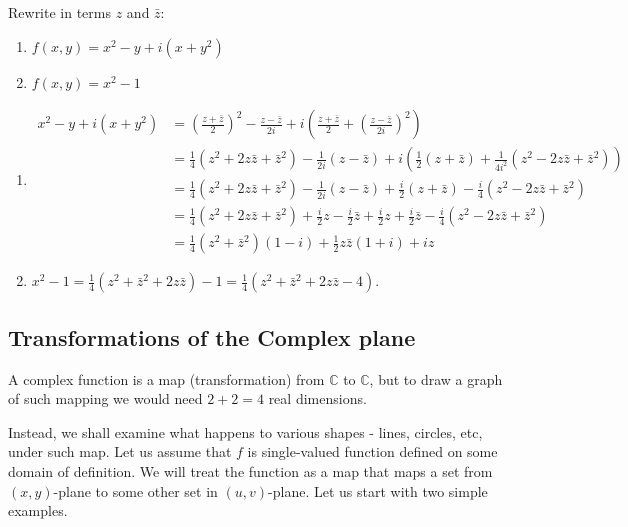 \begin{example} \label{example:3.9} Rewrite in terms $z$ and $\bar{z}$:
    \begin{enumerate}[label=\alph*)]
        \item $f(x, y) = x^2 - y + i(x + y^2)$
        \item $f(x, y) = x^2 - 1$
    \end{enumerate}

\begin{soln}
    \begin{enumerate}[label=\alph*)]
        \item
        \begin{align*}
        x^2 - y + i(x + y^2) &= \left(\frac{z + \bar{z}}{2}\right)^2 - \frac{z - \bar{z}}{2i} + i\left(\frac{z + \bar{z}}{2} + \left(\frac{z - \bar{z}}{2i}\right)^2\right) \\
        &= \frac{1}{4}(z^2 + 2z\bar{z} + \bar{z}^2) - \frac{1}{2i}(z - \bar{z}) + i\left(\frac{1}{2}(z + \bar{z}) + \frac{1}{4i^2}(z^2 - 2z\bar{z} + \bar{z}^2)\right) \\
        &= \frac{1}{4}(z^2 + 2z\bar{z} + \bar{z}^2) - \frac{1}{2i}(z - \bar{z}) + \frac{i}{2}(z + \bar{z}) - \frac{i}{4}(z^2 - 2z\bar{z} + \bar{z}^2) \\
        &= \frac{1}{4}(z^2 + 2z\bar{z} + \bar{z}^2) + \frac{i}{2}z - \frac{i}{2}\bar{z} + \frac{i}{2}z + \frac{i}{2}\bar{z} - \frac{i}{4}(z^2 - 2z\bar{z} + \bar{z}^2) \\
        &= \frac{1}{4}(z^2 + \bar{z}^2)(1 - i) + \frac{1}{2}z\bar{z}(1 + i) + iz
        \end{align*}
        \item $x^2 - 1 = \frac{1}{4}(z^2 + \bar{z}^2 + 2z\bar{z}) - 1 = \frac{1}{4}(z^2 + \bar{z}^2 + 2z\bar{z} - 4)$.
    \end{enumerate}
\end{soln}

\end{example}
\subsection{Transformations of the Complex plane}

A complex function is a map (transformation) from $\mathbb{C}$ to $\mathbb{C}$, but to draw a graph of such mapping we would need $2 + 2 = 4$ real dimensions.

Instead, we shall examine what happens to various shapes - lines, circles, etc, under such map. Let us assume that $f$ is single-valued function defined on some domain of definition. 
We will treat the function as a map that maps a set from $(x, y)$-plane to some other set in $(u, v)$-plane. Let us start with two simple examples.

